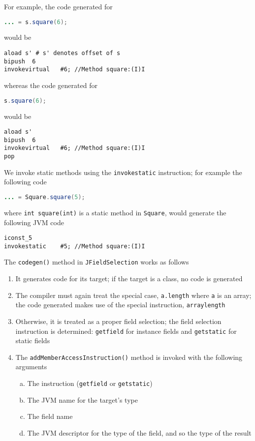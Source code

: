 \documentclass[8pt,a4paper,compress]{beamer}
\begin{document}
\begin{frame}[fragile]
\pause

For example, the code generated for 
\begin{lstlisting}[language=Java]
... = s.square(6);
\end{lstlisting}
would be
\begin{lstlisting}[language={}]
aload s' # s' denotes offset of s
bipush  6
invokevirtual   #6; //Method square:(I)I
\end{lstlisting}

whereas the code generated for 
\begin{lstlisting}[language=Java]
s.square(6);
\end{lstlisting}
would be 
\begin{lstlisting}[language={}]
aload s'
bipush  6
invokevirtual   #6; //Method square:(I)I
pop
\end{lstlisting}

\pause
\bigskip

We invoke static methods using the \lstinline{invokestatic} instruction; for example the following \jmm code
\begin{lstlisting}[language=Java]
... = Square.square(5);
\end{lstlisting}
where \lstinline{int square(int)} is a static method in \lstinline{Square}, would generate the following JVM code
\begin{lstlisting}[language={}]
iconst_5
invokestatic    #5; //Method square:(I)I
\end{lstlisting}
\end{frame}

\begin{frame}[fragile]
\pause

The \lstinline{codegen()} method in \lstinline{JFieldSelection} works as follows
\begin{enumerate}
\item It generates code for its target; if the target is a class, no code is generated
\item The compiler must again treat the special case, \lstinline{a.length} where \lstinline{a} is an array; the code generated makes use of the special instruction, \lstinline{arraylength}
\item Otherwise, it is treated as a proper field selection; the field selection instruction is determined: \lstinline{getfield} for instance fields and \lstinline{getstatic} for static fields
\item The \lstinline{addMemberAccessInstruction()} method is invoked with the following arguments
\begin{enumerate}[(a)]
\item The instruction (\lstinline{getfield} or \lstinline{getstatic})
\item The JVM name for the target's type
\item The field name
\item The JVM descriptor for the type of the field, and so the type of the result
\end{enumerate}
\end{enumerate}
\end{frame}
\end{document}
